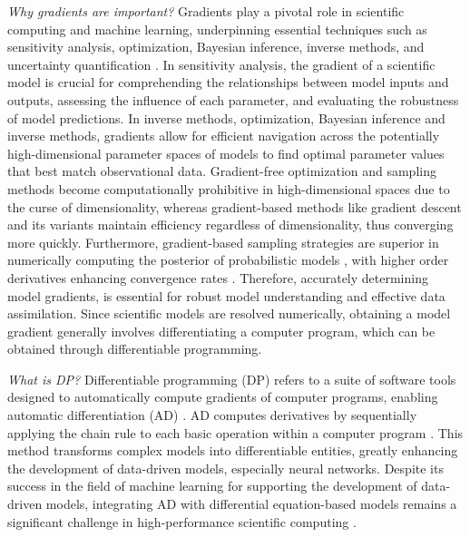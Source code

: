 \textit{Why gradients are important?}
Gradients play a pivotal role in scientific computing and machine learning, underpinning essential techniques such as sensitivity analysis, optimization, Bayesian inference, inverse methods, and uncertainty quantification \cite{Razavi.2021}. In sensitivity analysis, the gradient of a scientific model is crucial for comprehending the relationships between model inputs and outputs, assessing the influence of each parameter, and evaluating the robustness of model predictions. In inverse methods, optimization, Bayesian inference and inverse methods, gradients allow for efficient navigation across the potentially high-dimensional parameter spaces of models to find optimal parameter values that best match observational data. Gradient-free optimization and sampling methods become computationally prohibitive in high-dimensional spaces due to the curse of dimensionality, whereas gradient-based methods like gradient descent and its variants \cite{ruder2016overview-gradient-descent} maintain efficiency regardless of dimensionality, thus converging more quickly. Furthermore, gradient-based sampling strategies are superior in numerically computing the posterior of probabilistic models \cite{neal2011mcmc}, with higher order derivatives enhancing convergence rates \cite{BuiThanh:2012ul}. Therefore, accurately determining model gradients, is essential for robust model understanding and effective data assimilation.  Since scientific models are resolved numerically, obtaining a model gradient generally involves differentiating a computer program, which can be obtained through differentiable programming.

\textit{What is DP?}
Differentiable programming (DP) refers to a suite of software tools designed to automatically compute gradients of computer programs, enabling automatic differentiation (AD) \cite{Innes_Zygote}. AD computes derivatives by sequentially applying the chain rule to each basic operation within a computer program \cite{Griewank:2008kh, Naumann.2011}. This method transforms complex models into differentiable entities, greatly enhancing the development of data-driven models, especially neural networks. Despite its success in the field of machine learning for supporting the development of data-driven models, integrating AD with differential equation-based models remains a significant challenge in high-performance scientific computing \cite{Naumann.2011}.

